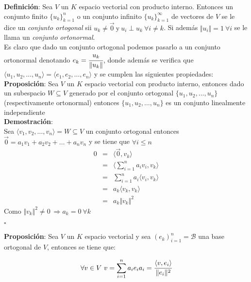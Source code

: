 \documentclass[a4paper,spanish]{article}
\numberwithin{equation}{section}
\begin{document}
\textbf{Definici\'on}: Sea $V$ un $K$ espacio vectorial con producto interno. Entonces un conjunto finito $\lbrace{u_k}\rbrace_{k=1} ^n$ o un conjunto infinito $\lbrace{u_k}\rbrace_{k=1} ^{\infty}$ de vectores de $V$ se le dice un \textit{conjunto ortogonal} sii $u_k \neq \vec{0} \ \mbox{y} \ u_i \perp u_k \ \forall i\neq k $. Si adem\'as $\Vert{u_i}\Vert =1 \ \forall i$ se le llama un \textit{conjunto ortonormal}.\\
\newline
Es claro que dado un conjunto ortogonal podemos pasarlo a un conjunto ortonormal denotando $e_k=\cfrac{u_k}{\Vert{u_k}\Vert}$, donde adem\'as se verifica que $\langle{u_1,u_2,\dots,u_n}\rangle = \langle{e_1,e_2,\dots,e_n}\rangle$ y se cumplen las siguientes propiedades:\\

\textbf{Proposici\'on}: Sea $V$ un $K$ espacio vectorial con producto interno, entonces dado un subespacio $W \subseteq V$ generado por el conjunto ortogonal $\lbrace{u_1,u_2,\dots,u_n}\rbrace$ (respectivamente ortonormal) entonces $\lbrace{u_1,u_2,\dots,u_n}\rbrace$ es un conjunto linealmente independiente\\

\textbf{Demostraci\'on}:\\
Sea $\langle{v_1,v_2,\dots,v_n}\rangle=W \subseteq V$ un conjunto ortogonal entonces $\vec{0}=a_1v_1+a_2v_2+\dots+a_nv_n$ y se tiene que
$\forall i\leq n$ \\

\[\begin{array}{rcl}
0 & = & \langle{\vec{0},v_k}\rangle\\
& = & \langle{\sum\limits_{i=1}^{n}{a_iv_i},v_k}\rangle \\
& = & \sum\limits _{i=1}^{n}{a_i\langle{v_i,v_k}\rangle} \\
& = & a_k\langle{v_k,v_k}\rangle \\
& = & a_k\Vert{v_k}\Vert ^2
\end{array}
\]
Como $\Vert{v_k}\Vert ^2 \neq 0 \ \Longrightarrow a_k=0 \ \forall k$

\begin{flushright}
$\square$
\end{flushright}

\textbf{Proposici\'on}: Sea $V$ un $K$ espacio vectorial y sea $\left({e_k}\right)_{i=1}^{n}=\mathcal{B}$ una base ortogonal de $V$, entonces se tiene que:

\[ \forall v \in V \ v=\sum\limits_{i=1}^{n}{a_ie_i} \\
a_i= \cfrac{\langle{v,e_i}\rangle}{\Vert{e_i}\Vert ^2} \]
\end{document}
